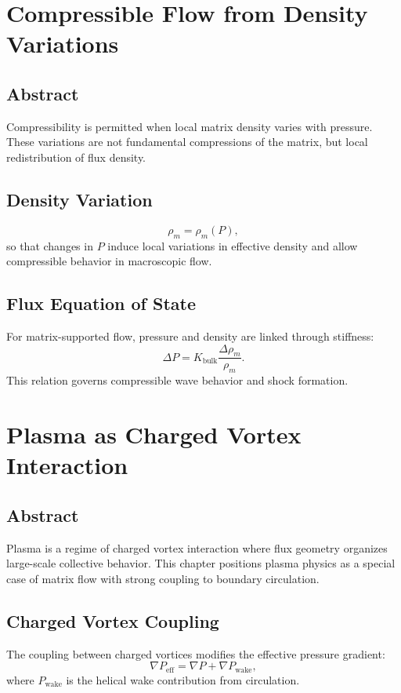 \documentclass[12pt]{book}
\begin{document}
\chapter{Compressible Flow from Density Variations}

\section*{Abstract}
Compressibility is permitted when local matrix density varies with pressure. These variations are not
fundamental compressions of the matrix, but local redistribution of flux density.

\section{Density Variation}
\begin{equation}
\rho_m = \rho_m(P),
\end{equation}
so that changes in $P$ induce local variations in effective density and allow compressible behavior in
macroscopic flow.

\section{Flux Equation of State}
For matrix-supported flow, pressure and density are linked through stiffness:
\begin{equation}
\Delta P = K_{\text{bulk}} \frac{\Delta \rho_m}{\rho_m}.
\end{equation}
This relation governs compressible wave behavior and shock formation.

\chapter{Plasma as Charged Vortex Interaction}

\section*{Abstract}
Plasma is a regime of charged vortex interaction where flux geometry organizes large-scale collective
behavior. This chapter positions plasma physics as a special case of matrix flow with strong coupling to
boundary circulation.

\section{Charged Vortex Coupling}
The coupling between charged vortices modifies the effective pressure gradient:
\begin{equation}
\nabla P_{\text{eff}} = \nabla P + \nabla P_{\text{wake}},
\end{equation}
where $P_{\text{wake}}$ is the helical wake contribution from circulation.
\end{document}
